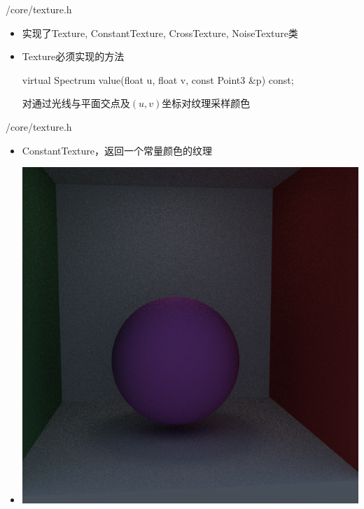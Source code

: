 \documentclass{beamer}
\begin{document}
\begin{frame} {/core/texture.h}
\begin{itemize} [<+->]
\item 实现了Texture, ConstantTexture, CrossTexture, NoiseTexture类
\item Texture必须实现的方法
\begin{semiverbatim} virtual Spectrum value(float u, float v, const Point3 \&p) const; \end{semiverbatim}
对通过光线与平面交点及$(u, v)$坐标对纹理采样颜色
\end{itemize}
\end{frame}

\begin{frame} {/core/texture.h}
\begin{itemize}
\item ConstantTexture，返回一个常量颜色的纹理
\item \includegraphics[scale=0.2]{constant}
\end{itemize}
\end{frame}
\end{document}

